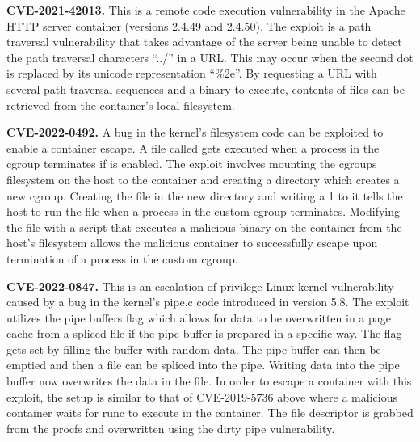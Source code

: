 \noindent\textbf{CVE-2021-42013.} This is a remote code execution vulnerability in the Apache HTTP server container (versions 2.4.49 and 2.4.50). The exploit is a path traversal vulnerability that takes advantage of the server being unable to detect the path traversal characters ``../'' in a URL. This may occur when the second dot is replaced by its unicode representation ``\%2e''. By requesting a URL with several path traversal sequences and a binary to execute, contents of files can be retrieved from the container's local filesystem.

\noindent\textbf{CVE-2022-0492.} A bug in the kernel's  filesystem code can be exploited to enable a container escape. A file called  gets executed when a process in the cgroup terminates if  is enabled. The exploit involves mounting the cgroups filesystem on the host to the container and creating a directory which creates a new cgroup. Creating the  file in the new directory and writing a 1 to it tells the host to run the  file when a process in the custom cgroup terminates. Modifying the  file with a script that executes a malicious binary on the container from the host's filesystem allows the malicious container to successfully escape upon termination of a process in the custom cgroup.

\noindent\textbf{CVE-2022-0847.} This is an escalation of privilege Linux kernel vulnerability caused by a bug in the kernel's pipe.c code introduced in version 5.8. The exploit utilizes the pipe buffers flag  which allows for data to be overwritten in a page cache from a spliced file if the pipe buffer is prepared in a specific way. The flag gets set by filling the buffer with random data. The pipe buffer can then be emptied and then a file can be spliced into the pipe. Writing data into the pipe buffer now overwrites the data in the file. In order to escape a container with this exploit, the setup is similar to that of CVE-2019-5736 above where a malicious container waits for runc to execute in the container. The file descriptor is grabbed from the procfs and overwritten using the dirty pipe vulnerability.

